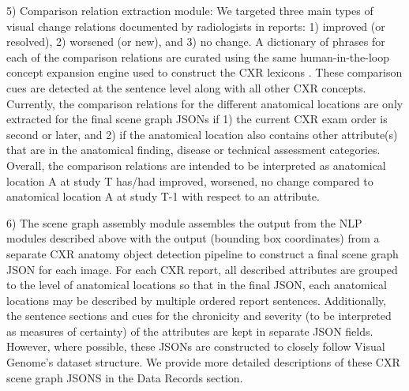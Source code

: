 5) Comparison relation extraction module: We targeted three main types of visual change relations documented by radiologists in reports: 1) improved (or resolved), 2) worsened (or new), and 3) no change. A dictionary of phrases for each of the comparison relations are curated using the same human-in-the-loop concept expansion engine used to construct the CXR lexicons \cite{}. These comparison cues are detected at the sentence level along with all other CXR concepts. Currently, the comparison relations for the different anatomical locations are only extracted for the final scene graph JSONs if 1) the current CXR exam order is second or later, and 2) if the anatomical location also contains other attribute(s) that are in the anatomical finding, disease or technical assessment categories. Overall, the comparison relations are intended to be interpreted as {anatomical location A at study T} has/had {improved, worsened, no change} compared to {anatomical location A at study T-1} with respect to an  attribute. 

6) The scene graph assembly module assembles the output from the NLP modules described above with the output (bounding box coordinates) from a separate CXR anatomy object detection pipeline to construct a final scene graph JSON for each image. For each CXR report, all described attributes are grouped to the level of anatomical locations so that in the final JSON, each anatomical locations may be described by multiple ordered report sentences. Additionally, the sentence sections and cues for the chronicity and severity (to be interpreted as measures of certainty) of the attributes are kept in separate JSON fields. However, where possible, these JSONs are constructed to closely follow Visual Genome's dataset structure. We provide more detailed descriptions of these CXR scene graph JSONS in the Data Records section. 




